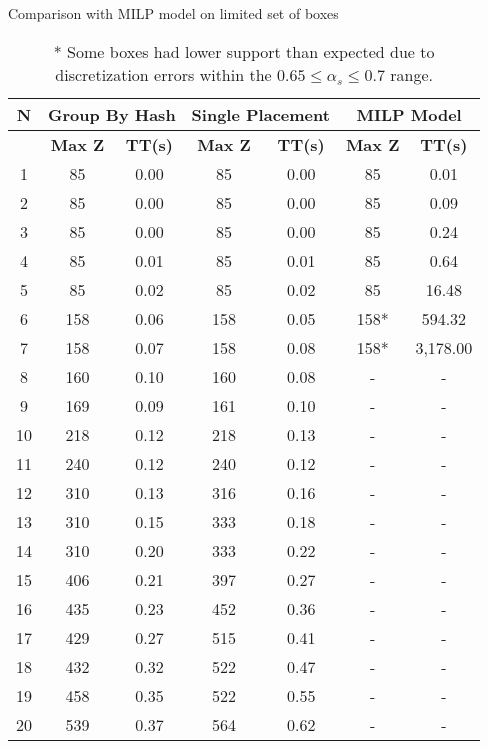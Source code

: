 \begin{table}[htbp]
    \centering
    \caption{Comparison with MILP model on limited set of boxes}
    \begin{tabular}{|c|c|c|c|c|c|c|}
    \hline
    \textbf{N} & \multicolumn{ 2}{c|}{\textbf{Group By Hash}} & \multicolumn{ 2}{c|}{\textbf{Single Placement}} & \multicolumn{ 2}{c|}{\textbf{MILP Model}} \\ \hline
    \multicolumn{1}{|l|}{} & \textbf{Max Z} & \textbf{TT(s)} & \textbf{Max Z} & \textbf{TT(s)} & \textbf{Max Z} & \textbf{TT(s)} \\ \hline
    1 & 85 & 0.00 & 85 & 0.00 & 85 & 0.01 \\ 
    2 & 85 & 0.00 & 85 & 0.00 & 85 & 0.09 \\ 
    3 & 85 & 0.00 & 85 & 0.00 & 85 & 0.24 \\ 
    4 & 85 & 0.01 & 85 & 0.01 & 85 & 0.64 \\ 
    5 & 85 & 0.02 & 85 & 0.02 & 85 & 16.48 \\ 
    6 & 158 & 0.06 & 158 & 0.05 & 158* & 594.32 \\ 
    7 & 158 & 0.07 & 158 & 0.08 & 158* & 3,178.00 \\ \hline
    8 & 160 & 0.10 & 160 & 0.08 & - & - \\ 
    9 & 169 & 0.09 & 161 & 0.10 & - & - \\ 
    10 & 218 & 0.12 & 218 & 0.13 & - & - \\ 
    11 & 240 & 0.12 & 240 & 0.12 & - & - \\ 
    12 & 310 & 0.13 & 316 & 0.16 & - & - \\ 
    13 & 310 & 0.15 & 333 & 0.18 & - & - \\ 
    14 & 310 & 0.20 & 333 & 0.22 & - & - \\ 
    15 & 406 & 0.21 & 397 & 0.27 & - & - \\ 
    16 & 435 & 0.23 & 452 & 0.36 & - & - \\ 
    17 & 429 & 0.27 & 515 & 0.41 & - & - \\ 
    18 & 432 & 0.32 & 522 & 0.47 & - & - \\ 
    19 & 458 & 0.35 & 522 & 0.55 & - & - \\ 
    20 & 539 & 0.37 & 564 & 0.62 & - & - \\ \hline
    \end{tabular}
    \label{exp:model}
    \caption*{* Some boxes had lower support than expected due to discretization errors within the $ 0.65 \le \alpha_s \le 0.7$ range.}
    \end{table}
